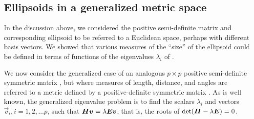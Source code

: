 \subsection{Ellipsoids in a generalized metric space}


In the discussion above, we considered the positive semi-definite matrix  and
corresponding ellipsoid to be
referred to a Euclidean space, perhaps with different basis vectors.
We showed that various measures of the ``size'' of the ellipsoid could be defined
in terms of functions of the eigenvalues $\lambda_i$ of .

We now consider the generalized
case of an analogous $p \times p$ positive semi-definite symmetric matrix , but where measures of
length, distance, and angles are referred to a metric defined by a positive-definite symmetric
matrix . As is well known, the generalized eigenvalue problem is to find the scalars
$\lambda_i$ and vectors $\vec{v}_i, i=1, 2, \dots p$,
such that $\bm{H} \bm{v} = \lambda \bm{E} \bm{v}$, that is, the roots of
$\mathrm{det} (\bm{H} - \lambda \bm{E})=0$.

